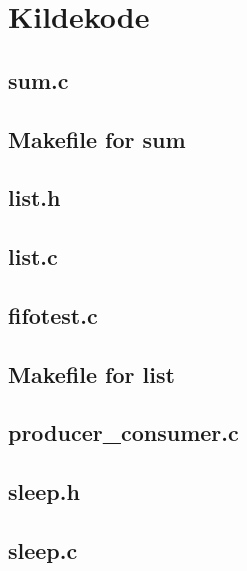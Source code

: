 \section{Kildekode}
\subsection{sum.c}


\subsection{Makefile for sum}


\subsection{list.h}


\subsection{list.c}


\subsection{fifotest.c}


\subsection{Makefile for list}


\subsection{producer\_consumer.c}


\subsection{sleep.h}


\subsection{sleep.c}


